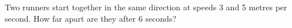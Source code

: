 Two runners start together in the same direction at speeds 3 and 5 metres per second. How far apart are they after 6 seconds?
